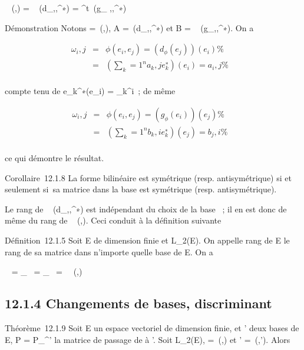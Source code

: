 \documentclass[]{article}
\begin{document}
\mathrmMat~ (\phi,)
= \mathrmMat~
(d_\phi,,^∗) = ^t\
\mathrmMat (g_ \phi,,^∗)

Démonstration Notons \Omega =\
\mathrmMat (\phi,), A =\
\mathrmMat (d_\phi,,^∗) et B
= \mathrmMat~
(g_\phi,\mathcal{E},\mathcal{E}^∗). On a

\begin{align*} \omega_i,j& =&
\phi(e_i,e_j) = \left
(d_\phi(e_j)\right )(e_i) \%&
\\ & =& \left
(\sum _k=1^na_
k,je_k^∗\right )(e_ i) =
a_i,j\%& \\
\end{align*}

compte tenu de e_k^∗(e_i) =
\delta_k^i~; de même

\begin{align*} \omega_i,j& =&
\phi(e_i,e_j) = \left
(g_\phi(e_i)\right )(e_j) \%&
\\ & =& \left
(\sum _k=1^nb_
k,ie_k^∗\right )(e_ j) =
b_j,i\%& \\
\end{align*}

ce qui démontre le résultat.

Corollaire~12.1.8 La forme bilinéaire \phi est symétrique (resp.
antisymétrique) si et seulement si~sa matrice dans la base  est
symétrique (resp. antisymétrique).

Le rang de \mathrmMat~
(d_\phi,,^∗) est indépendant du choix de la base \mathcal{E}~;
il en est donc de même du rang de
\mathrmMat~ (\phi,\mathcal{E}). Ceci
conduit à la définition suivante

Définition~12.1.5 Soit E de dimension finie et \phi \in L_2(E). On
appelle rang de E le rang de sa matrice dans n'importe quelle base de E.
On a

\mathrmrg~\phi
= \mathrmrgd_\phi~
= \mathrmrgg_\phi~
=\
\mathrmrg\mathrmMat~
(\phi,)

\subsection{12.1.4 Changements de bases, discriminant}

Théorème~12.1.9 Soit E un espace vectoriel de dimension finie,  et '
deux bases de E, P = P_^' la matrice de passage de  à
\mathcal{E}'. Soit \phi \in L_2(E), \Omega =\
\mathrmMat (\phi,) et \Omega' =\
\mathrmMat (\phi,'). Alors
\end{document}

